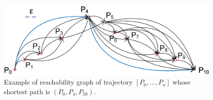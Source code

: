\begin{figure}[tb!]
	\centering
	\includegraphics[scale=0.75]{Figures/Fig-Optimal.png}\vspace{-1ex}
	\caption{\small Example of reachability graph of trajectory $[P_0, \ldots, P_n]$ whose shortest path is $(P_0, P_4, P_{10})$.}	\vspace{-3ex}
	\label{fig:optimal}
\end{figure}



